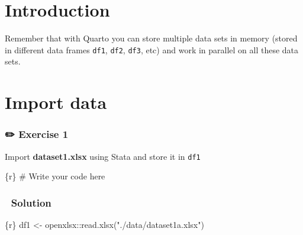 \documentclass[
  letterpaper,
  DIV=11,
  numbers=noendperiod,
  oneside]{scrreprt}
\newenvironment{Shaded}{\begin{snugshade}}{\end{snugshade}}
\newcommand{\CommentTok}[1]{\textcolor[rgb]{0.37,0.37,0.37}{#1}}
\newcommand{\FunctionTok}[1]{\textcolor[rgb]{0.28,0.35,0.67}{#1}}
\newcommand{\InformationTok}[1]{\textcolor[rgb]{0.37,0.37,0.37}{#1}}
\newcommand{\NormalTok}[1]{\textcolor[rgb]{0.00,0.23,0.31}{#1}}
\newcommand{\OtherTok}[1]{\textcolor[rgb]{0.00,0.23,0.31}{#1}}
\newcommand{\SpecialCharTok}[1]{\textcolor[rgb]{0.37,0.37,0.37}{#1}}
\newcommand{\StringTok}[1]{\textcolor[rgb]{0.13,0.47,0.30}{#1}}
\begin{document}
\hypertarget{introduction-8}{%
\section{Introduction}\label{introduction-8}}

\begin{tcolorbox}[enhanced jigsaw, coltitle=black, opacityback=0, title=\textcolor{quarto-callout-important-color}{\faExclamation}\hspace{0.5em}{Important}, toprule=.15mm, bottomtitle=1mm, colbacktitle=quarto-callout-important-color!10!white, colframe=quarto-callout-important-color-frame, left=2mm, opacitybacktitle=0.6, bottomrule=.15mm, arc=.35mm, toptitle=1mm, colback=white, titlerule=0mm, breakable, leftrule=.75mm, rightrule=.15mm]

Remember that with Quarto you can store multiple data sets in memory
(stored in different data frames \texttt{df1}, \texttt{df2},
\texttt{df3}, etc) and work in parallel on all these data sets.

\end{tcolorbox}

\hypertarget{import-data}{%
\section{Import data}\label{import-data}}

\subsubsection{\texorpdfstring{{✏️} Exercise 1}{✏️ Exercise 1}}

Import \textbf{dataset1.xlsx} using Stata and store it in \texttt{df1}

\begin{Shaded}
\begin{Highlighting}[]
\InformationTok{\textasciigrave{}\textasciigrave{}\textasciigrave{}\{r\}}
\CommentTok{\# Write your code here}
\InformationTok{\textasciigrave{}\textasciigrave{}\textasciigrave{}}
\end{Highlighting}
\end{Shaded}

\subsubsection{\texorpdfstring{{👀} Solution}{👀 Solution}}

\begin{Shaded}
\begin{Highlighting}[]
\InformationTok{\textasciigrave{}\textasciigrave{}\textasciigrave{}\{r\}}
\NormalTok{df1 }\OtherTok{\textless{}{-}}\NormalTok{ openxlsx}\SpecialCharTok{::}\FunctionTok{read.xlsx}\NormalTok{(}\StringTok{"./data/dataset1a.xlsx"}\NormalTok{)}
\InformationTok{\textasciigrave{}\textasciigrave{}\textasciigrave{}}
\end{Highlighting}
\end{Shaded}
\end{document}
